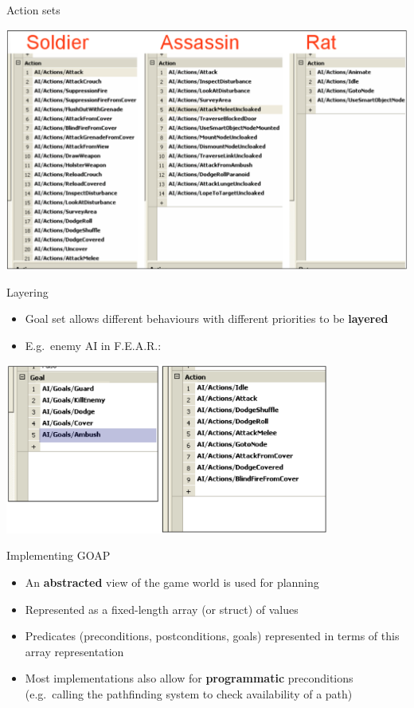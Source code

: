 \begin{frame}{Action sets}
    \begin{center}
        \includegraphics[width=\textwidth]{goap_action_sets}
    \end{center}
\end{frame}

\begin{frame}{Layering}
    \begin{itemize}
        \pause\item Goal set allows different behaviours with different priorities to be \textbf{layered}
        \pause\item E.g.\ enemy AI in F.E.A.R.:
    \end{itemize}
    \begin{center}
        \includegraphics[width=0.8\textwidth]{goap_layering}
    \end{center}
\end{frame}

\begin{frame}{Implementing GOAP}
    \begin{itemize}
        \pause\item An \textbf{abstracted} view of the game world is used for planning
        \pause\item Represented as a fixed-length array (or struct) of values
        \pause\item Predicates (preconditions, postconditions, goals)
            represented in terms of this array representation
        \pause\item Most implementations also allow for \textbf{programmatic} preconditions
            (e.g.\ calling the pathfinding system to check availability of a path)
    \end{itemize}
\end{frame}

